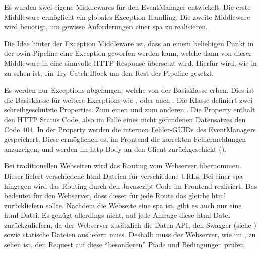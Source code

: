 
Es wurden zwei eigene Middlewares für den EventManager entwickelt. Die erste Middleware ermöglicht ein globales Exception Handling. Die zweite Middleware wird benötigt, um gewisse Anforderungen einer \gls{spa} zu realisieren.


Die Idee hinter der Exception Middleware ist, dass an einem beliebigen Punkt in der \gls{owin}-Pipeline eine Exception geworfen werden kann, welche dann von dieser Middleware in eine sinnvolle HTTP-Response übersetzt wird. Hierfür wird, wie in  zu sehen ist, ein Try-Catch-Block um den Rest der Pipeline gesetzt.

Es werden nur Exceptions abgefangen, welche von der  Basisklasse erben. Dies ist die Basisklasse für weitere Exceptions wie \zB {},  oder auch . Die  Klasse definiert zwei schreibgeschützte Properties. Zum einen  und zum anderen . Die  Property enthält den HTTP Status Code, also \zB im Falle eines nicht gefundenen Datensatzes den Code 404. In der  Property werden die internen Fehler-GUIDs des EventManagers gespeichert. Diese ermöglichen es, im Frontend die korrekten Fehlermeldungen anzuzeigen, und werden im \gls{http}-Body an den Client zurückgeschickt ().



Bei traditionellen Webseiten wird das Routing vom Webserver übernommen. Dieser liefert verschiedene \gls{html} Dateien für verschiedene URLs. Bei einer \gls{spa} hingegen wird das Routing durch den Javascript Code im Frontend realisiert. Das bedeutet für den Webserver, dass dieser für jede Route das gleiche \gls{html} zurückliefern sollte. Nachdem die Webseite eine \gls{spa} ist, gibt es auch nur eine \gls{html}-Datei. Es genügt allerdings nicht, auf jede Anfrage diese \gls{html}-Datei zurückzuliefern, da der Webserver zusätzlich die Daten-API, den Swagger (siehe ) sowie statische Dateien ausliefern muss. Deshalb muss der Webserver, wie im , zu sehen ist, den Request auf diese \enquote{besonderen} Pfade und Bedingungen prüfen.

